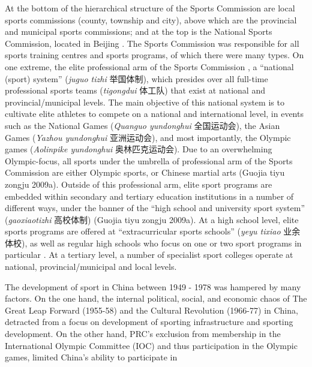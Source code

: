     At the bottom of the hierarchical structure of the Sports Commission are local sports commissions (county, township and city), above which are the provincial and municipal sports commissions; and at the top is the National Sports Commission, located in Beijing \citep[59]{Brownell1995}.  The Sports Commission was responsible for all sports training centres and sports programs, of which there were many types.  On one extreme, the elite professional arm of the Sports Commission , a ``national (sport) system'' (\textit{juguo tizhi} 举国体制), which presides over all full-time professional sports teams (\textit{tigongdui} 体工队) that exist at national and provincial/municipal levels.  The main objective of this national system is to cultivate elite athletes to compete on a national and international level, in events such as the National Games (\textit{Quanguo yundonghui} 全国运动会), the Asian Games (\textit{Yazhou yundonghui} 亚洲运动会), and most importantly, the Olympic games (\textit{Aolinpike yundonghui} 奥林匹克运动会).  Due to an overwhelming Olympic-focus, all sports under the umbrella of professional arm of the Sports Commission are either Olympic sports, or Chinese martial arts (Guojia tiyu zongju 2009a).  Outside of this professional arm, elite sport programs are embedded within secondary and tertiary education institutions in a number of different ways, under the banner of the ``high school and university sport system'' (\textit{gaoxiaotizhi} 高校体制) (Guojia tiyu zongju 2009a).  At a high school level, elite sports programs are offered at ``extracurricular sports schools'' (\textit{yeyu tixiao} 业余体校), as well as regular high schools who focus on one or two sport programs in particular \citep[59]{Brownell1995}. At a tertiary level, a number of specialist sport colleges operate at national, provincial/municipal and local levels.


    The development of sport in China between 1949 - 1978 was hampered by many factors.  On the one hand, the internal political, social, and economic chaos of The Great Leap Forward (1955-58) and the Cultural Revolution (1966-77) in China, detracted from a focus on development of sporting infrastructure and sporting development.  On the other hand, PRC's exclusion from membership in the International Olympic Committee (IOC) and thus participation in the Olympic games, limited China's ability to participate in


